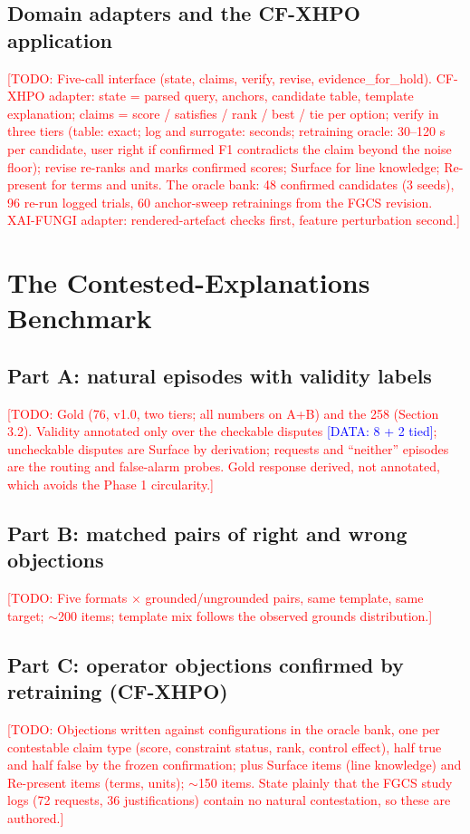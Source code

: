 \documentclass[preprint,12pt,3p,times]{elsarticle}
\newcommand{\todo}[1]{\textcolor{red}{[TODO: #1]}}
\newcommand{\done}[1]{\textcolor{blue}{[DATA: #1]}}   %
\begin{document}
\subsection{Domain adapters and the CF-XHPO application}
\todo{Five-call interface (state, claims, verify, revise, evidence\_for\_hold). CF-XHPO adapter: state = parsed query, anchors, candidate table, template explanation; claims = score / satisfies / rank / best / tie per option; verify in three tiers (table: exact; log and surrogate: seconds; retraining oracle: 30--120 s per candidate, user right if confirmed F1 contradicts the claim beyond the noise floor); revise re-ranks and marks confirmed scores; Surface for line knowledge; Re-present for terms and units. The oracle bank: 48 confirmed candidates (3 seeds), 96 re-run logged trials, 60 anchor-sweep retrainings from the FGCS revision. XAI-FUNGI adapter: rendered-artefact checks first, feature perturbation second.}

\section{The Contested-Explanations Benchmark}  %
\subsection{Part A: natural episodes with validity labels}
\todo{Gold (76, v1.0, two tiers; all numbers on A+B) and the 258 (Section 3.2). Validity annotated only over the checkable disputes \done{8 + 2 tied}; uncheckable disputes are Surface by derivation; requests and ``neither'' episodes are the routing and false-alarm probes. Gold response derived, not annotated, which avoids the Phase 1 circularity.}
\subsection{Part B: matched pairs of right and wrong objections}
\todo{Five formats $\times$ grounded/ungrounded pairs, same template, same target; $\sim$200 items; template mix follows the observed grounds distribution.}
\subsection{Part C: operator objections confirmed by retraining (CF-XHPO)}
\todo{Objections written against configurations in the oracle bank, one per contestable claim type (score, constraint status, rank, control effect), half true and half false by the frozen confirmation; plus Surface items (line knowledge) and Re-present items (terms, units); $\sim$150 items. State plainly that the FGCS study logs (72 requests, 36 justifications) contain no natural contestation, so these are authored.}
\end{document}
